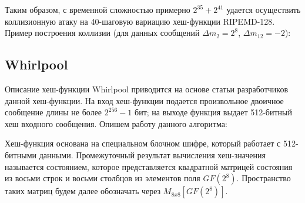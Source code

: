 \documentclass{./civarticle}
\begin{document}
Таким образом, с временной сложностью примерно $2^{35} + 2^{41}$ удается осуществить коллизионную атаку на 40-шаговую вариацию хеш-функции RIPEMD-128. Пример построения коллизии (для данных сообщений $\Delta m_2 = 2^8$, $\Delta m_{12} = -2$):
\begin{figure}[h!]
        \end{figure}

\subsection{Whirlpool}

Описание хеш-функции Whirlpool приводится на основе статьи \cite{Whirlpool} разработчиков данной хеш-функции. На вход хеш-функции подается произвольное двоичное сообщение длины не более $2^{256} - 1$ бит; на выходе функция выдает 512-битный хеш входного сообщения. Опишем работу данного алгоритма:

Хеш-функция основана на специальном блочном шифре, который работает с 512-битными данными. Промежуточный результат вычисления хеш-значения называется состоянием, которое представляется квадратной матрицей состояния из восьми строк и восьми столбцов из элементов поля $GF(2^8)$. Пространство таких матриц будем далее обозначать через $M_{8x8}[GF(2^8)]$.
\end{document}
